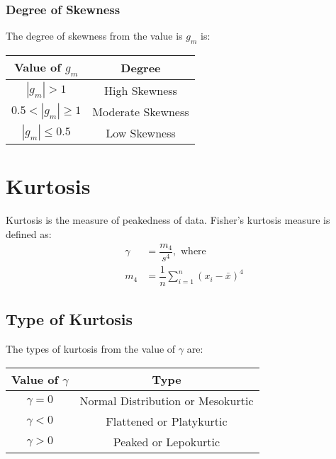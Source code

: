 \subsubsection{Degree of Skewness}
The degree of skewness from the value is $g_m$ is:
\begin{table}[h!]
	\centering
	\begin{tabular}{c|c}
		Value of $g_m$ & Degree\\
		\hline
		$|g_m| > 1$ & High Skewness\\
		$0.5 <|g_m| \geq 1$ & Moderate Skewness\\
		$|g_m| \leq 0.5$ & Low Skewness
	\end{tabular}
\end{table}

\section{Kurtosis}
Kurtosis is the measure of peakedness of data. Fisher's kurtosis measure is defined as:
\begin{align}
	\gamma &= \dfrac{m_4}{s^4}, \text{ where}\\
	m_4 &= \dfrac{1}{n}\sum_{i=1}^{n} \left( x_i - \bar{x} \right)^4
\end{align}

\subsection{Type of Kurtosis}
The types of kurtosis from the value of $\gamma$ are:
\begin{table}[h!]
	\centering
	\begin{tabular}{c|c}
		Value of $\gamma$ & Type\\
		\hline
		$\gamma = 0$ & Normal Distribution or Mesokurtic\\
		$\gamma < 0$ & Flattened or Platykurtic\\
		$\gamma > 0$ & Peaked or Lepokurtic
	\end{tabular}
\end{table}
